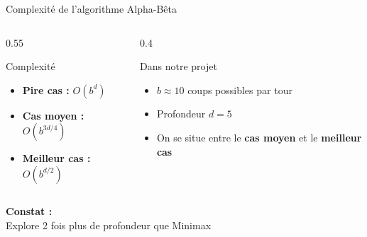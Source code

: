 \documentclass[10pt, aspectratio=169]{beamer}
\begin{document}
\begin{frame}{Complexité de l'algorithme Alpha-Bêta}

    \vspace{0.3cm}

    \begin{columns}[T]
        \begin{column}{0.55\textwidth}
            \begin{block}{Complexité}
                \begin{itemize}
                    \item \textbf{Pire cas :} $O(b^d)$  
                    \vspace{0.2cm}
                    \item \textbf{Cas moyen :} $O(b^{3d/4})$ 
                    \vspace{0.2cm}
                    \item \textbf{Meilleur cas :} $O(b^{d/2})$ 
                \end{itemize}
            \end{block}
        \end{column}

        \begin{column}{0.4\textwidth}
            \begin{block}{Dans notre projet}
                \begin{itemize}
                    \item $b \approx 10$ coups possibles par tour
                    \item Profondeur $d = 5$
                    \vspace{0.2cm}
                    \item On se situe entre le \textbf{cas moyen} et le \textbf{meilleur cas}
                \end{itemize}
                \end{block}
            \vspace{0.2cm}
    
        \end{column}
    \end{columns}
    \centering
            \vspace{0.2cm}
            \textcolor{DarkPink}{\textbf{Constat :}} \\
            Explore 2 fois plus de profondeur que Minimax \\

\end{frame}
\end{document}
